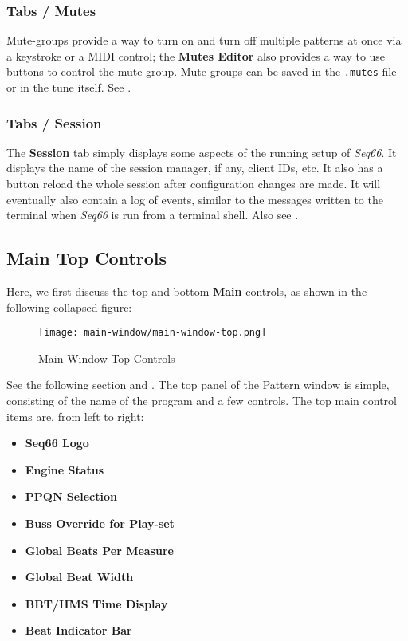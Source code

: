\subsubsection{Tabs / Mutes}
\label{subsubsec:introduction_main_tabs_mutes}

   Mute-groups provide a way to turn on and turn off multiple patterns at once
   via a keystroke or a MIDI control; the \textbf{Mutes Editor} also provides a
   way to use buttons to control the mute-group.
   Mute-groups can be saved in the
   \texttt{.mutes} file or in the tune itself.
   See .

\subsubsection{Tabs / Session}
\label{subsubsec:introduction_main_tabs_session}

   The \textbf{Session} tab simply displays some aspects of the running setup of
   \textsl{Seq66}.  It displays the name of the session manager, if any, client
   IDs, etc.  It also has a button reload the whole session after configuration
   changes are made.  It will eventually also contain a log of events, similar
   to the messages written to the terminal when \textsl{Seq66} is run from a
   terminal shell.
   Also see .

\subsection{Main Top Controls}
\label{subsec:introduction_main_top_controls}

   Here, we first discuss the top and bottom \textbf{Main} controls, as
   shown in the following collapsed figure:

\begin{figure}[H]
   \centering 
   \texttt{[image: main-window/main-window-top.png]}
   \caption{Main Window Top Controls}
   \label{fig:main_window_top_controls}
\end{figure}

   See the following section and
   .
   The top panel of the Pattern window is simple, consisting of the
   name of the program and a few controls.
   The top main control items are, from left to right:

   \begin{itemize}
      \item \textbf{Seq66 Logo}
      \item \textbf{Engine Status}
      \item \textbf{PPQN Selection}
      \item \textbf{Buss Override for Play-set}
      \item \textbf{Global Beats Per Measure}
      \item \textbf{Global Beat Width}
      \item \textbf{BBT/HMS Time Display}
      \item \textbf{Beat Indicator Bar}
   \end{itemize}

